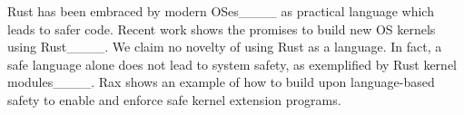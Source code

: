 






 Rust has been embraced
    by modern OSes____ as
    practical language which leads to safer code.
Recent work shows the promises to build new OS kernels using Rust____.
We claim no novelty of using Rust as a language.
In fact, a safe language alone does not lead to system safety,
    as exemplified by Rust kernel modules____.
Rax shows an example of how to build upon language-based safety
    to enable and enforce safe kernel extension programs.


